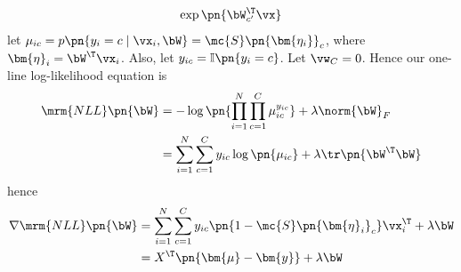 \documentclass[189]{pset}
\begin{document}
\begin{enumerate}
\begin{align*}
{            \exp\pn{\bW_{c'}^\T \vx}}
        \end{align*}
        let $\mu_{ic} = p\pn{y_i = c \mid \vx_i, \bW} =
        \mc{S}\pn{\bm{\eta_i}}_c$, where $\bm{\eta}_i = \bW^\T \vx_i$.
        Also, let $y_{ic} = \mathbb{I}\pn{y_i = c}$. Let $\vw_C = 0$.
        Hence our one-line log-likelihood equation is
        \begin{align*}
          \mrm{NLL}\pn{\bW}
          &= -\log \pn{\prod_{i=1}^N \prod_{c=1}^C \mu_{ic}^{y_{ic}}}
            + \lambda \norm{\bW}_F \\
          &= \sum_{i=1}^N \sum_{c=1}^C y_{ic} \log\pn{\mu_{ic}} +
            \lambda \tr\pn{\bW^\T \bW}
        \end{align*}
        hence
        \begin{align*}
          \nabla \mrm{NLL}\pn{\bW}
          &= \sum_{i=1}^N \sum_{c=1}^C y_{ic} \pn{1 -
            \mc{S}\pn{\bm{\eta}_i}_c} \vx_i^\T + \lambda \bW \\
          &= X^\T \pn{\bm{\mu} - \bm{y}} + \lambda \bW
        \end{align*}
    \end{enumerate}
\end{document}
